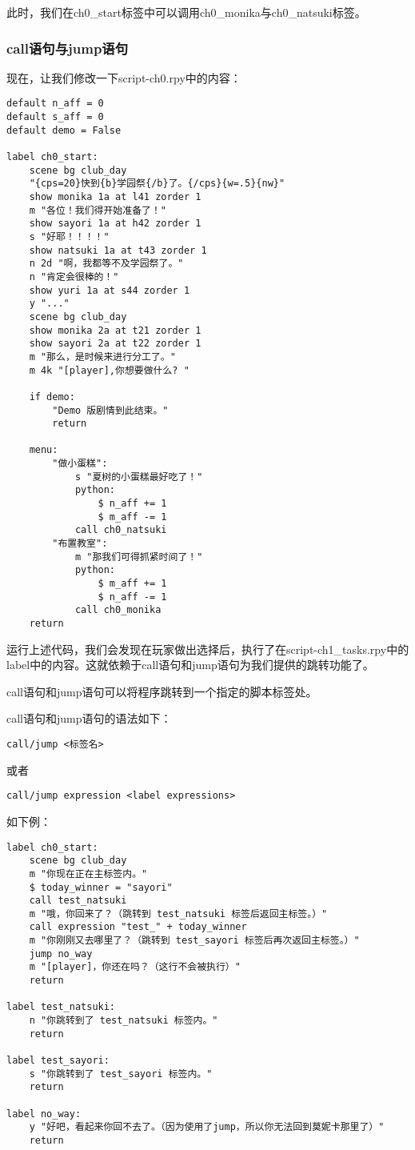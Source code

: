 此时，我们在ch0\_start标签中可以调用ch0\_monika与ch0\_natsuki标签。

\subsubsection{call语句与jump语句}

现在，让我们修改一下script-ch0.rpy中的内容：
\begin{lstlisting}[caption=script-ch0.rpy]
default n_aff = 0
default s_aff = 0
default demo = False

label ch0_start:
    scene bg club_day
    "{cps=20}快到{b}学园祭{/b}了。{/cps}{w=.5}{nw}"
    show monika 1a at l41 zorder 1
    m "各位！我们得开始准备了！"
    show sayori 1a at h42 zorder 1
    s "好耶！！！！"
    show natsuki 1a at t43 zorder 1
    n 2d "啊，我都等不及学园祭了。"
    n "肯定会很棒的！"
    show yuri 1a at s44 zorder 1
    y "..."
    scene bg club_day
    show monika 2a at t21 zorder 1
    show sayori 2a at t22 zorder 1
    m "那么，是时候来进行分工了。"
    m 4k "[player],你想要做什么? "

    if demo:
        "Demo 版剧情到此结束。"
        return

    menu:
        "做小蛋糕":
            s "夏树的小蛋糕最好吃了！"
            python:
                $ n_aff += 1
                $ m_aff -= 1
            call ch0_natsuki
        "布置教室":
            m "那我们可得抓紧时间了！"
            python:
                $ m_aff += 1
                $ n_aff -= 1
            call ch0_monika
    return
\end{lstlisting}

运行上述代码，我们会发现在玩家做出选择后，执行了在script-ch1\_tasks.rpy中的label中的内容。这就依赖于call语句和jump语句为我们提供的跳转功能了。

call语句和jump语句可以将程序跳转到一个指定的脚本标签处。

call语句和jump语句的语法如下：
\begin{lstlisting}
call/jump <标签名>
\end{lstlisting}

或者

\begin{lstlisting}
call/jump expression <label expressions>
\end{lstlisting}

如下例：
\begin{lstlisting}
label ch0_start:
    scene bg club_day
    m "你现在正在主标签内。"
    $ today_winner = "sayori"
    call test_natsuki
    m "哦，你回来了？（跳转到 test_natsuki 标签后返回主标签。）"
    call expression "test_" + today_winner
    m "你刚刚又去哪里了？（跳转到 test_sayori 标签后再次返回主标签。）"
    jump no_way
    m "[player]，你还在吗？（这行不会被执行）"
    return

label test_natsuki:
    n "你跳转到了 test_natsuki 标签内。"
    return

label test_sayori:
    s "你跳转到了 test_sayori 标签内。"
    return

label no_way:
    y "好吧，看起来你回不去了。（因为使用了jump，所以你无法回到莫妮卡那里了）"
    return
\end{lstlisting}

